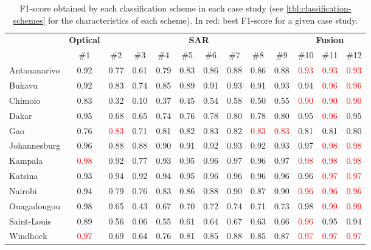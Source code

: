 \documentclass[remotesensing,article,submit,moreauthors,pdftex,10pt,a4paper]{Definitions/mdpi}
\begin{document}
\begin{table}[H]
    \caption{F1-score obtained by each classification scheme in each case
    study (see \autoref{tbl:classification-schemes} for the characteristics of
    each scheme). In red: best F1-score for a given case study.}
    \centering
    \label{tbl:score-per-scheme}
    \begin{tabular}{lcccccccccccc}
        \toprule
         & \multicolumn{1}{c}{\textbf{Optical}} & \multicolumn{8}{c}{\textbf{SAR}} & \multicolumn{3}{c}{\textbf{Fusion}} \\
        \cmidrule(rl){2-2} \cmidrule(rl){3-10} \cmidrule(rl){11-13}
         & \#1 & \#2 & \#3 & \#4 & \#5 & \#6 & \#7 & \#8 & \#9 & \#10 & \#11 & \#12 \\
        \midrule
        Antananarivo & 0.92 & 0.77 & 0.61 & 0.79 & 0.83 & 0.86 & 0.88 & 0.86 & 0.88 & \textcolor{red}{0.93} & \textcolor{red}{0.93} & \textcolor{red}{0.93} \\
        Bukavu & 0.92 & 0.83 & 0.74 & 0.85 & 0.89 & 0.91 & 0.93 & 0.91 & 0.93 & 0.94 & \textcolor{red}{0.96} & \textcolor{red}{0.96} \\
        Chimoio & 0.83 & 0.32 & 0.10 & 0.37 & 0.45 & 0.54 & 0.58 & 0.50 & 0.55 & \textcolor{red}{0.90} & \textcolor{red}{0.90} & \textcolor{red}{0.90} \\
        Dakar & 0.95 & 0.68 & 0.65 & 0.74 & 0.76 & 0.78 & 0.80 & 0.78 & 0.80 & 0.95 & \textcolor{red}{0.96} & 0.95 \\
        Gao & 0.76 & \textcolor{red}{0.83} & 0.71 & 0.81 & 0.82 & 0.83 & 0.82 & \textcolor{red}{0.83} & \textcolor{red}{0.83} & 0.81 & 0.81 & 0.80 \\
        Johannesburg & 0.96 & 0.88 & 0.88 & 0.90 & 0.91 & 0.92 & 0.93 & 0.92 & 0.93 & 0.97 & \textcolor{red}{0.98} & \textcolor{red}{0.98} \\
        Kampala & \textcolor{red}{0.98} & 0.92 & 0.77 & 0.93 & 0.95 & 0.96 & 0.97 & 0.96 & 0.97 & \textcolor{red}{0.98} & \textcolor{red}{0.98} & \textcolor{red}{0.98} \\
        Katsina & 0.93 & 0.94 & 0.92 & 0.94 & 0.95 & 0.96 & 0.96 & 0.96 & 0.96 & 0.96 & \textcolor{red}{0.97} & \textcolor{red}{0.97} \\
        Nairobi & 0.94 & 0.79 & 0.76 & 0.83 & 0.86 & 0.88 & 0.90 & 0.87 & 0.90 & \textcolor{red}{0.96} & \textcolor{red}{0.96} & \textcolor{red}{0.96} \\
        Ouagadougou & 0.98 & 0.65 & 0.43 & 0.67 & 0.70 & 0.72 & 0.74 & 0.71 & 0.73 & 0.98 & \textcolor{red}{0.99} & \textcolor{red}{0.99} \\
        Saint-Louis & 0.89 & 0.56 & 0.06 & 0.55 & 0.61 & 0.64 & 0.67 & 0.63 & 0.66 & \textcolor{red}{0.96} & 0.95 & 0.94 \\
        Windhoek & \textcolor{red}{0.97} & 0.69 & 0.64 & 0.76 & 0.81 & 0.85 & 0.88 & 0.85 & 0.87 & \textcolor{red}{0.97} & \textcolor{red}{0.97} & \textcolor{red}{0.97} \\
        \bottomrule
    \end{tabular}
\end{table}
\end{document}
